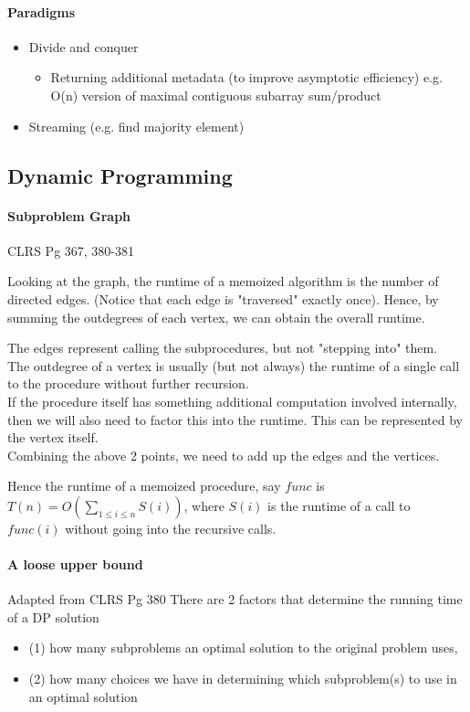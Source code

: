 \documentclass{article}
\begin{document}
\paragraph{Paradigms}
\begin{itemize}
	\item Divide and conquer
	\begin{itemize}
		\item Returning additional metadata (to improve asymptotic efficiency) e.g. O(n) version of maximal contiguous subarray sum/product
	\end{itemize}
	\item Streaming (e.g. find majority element)
\end{itemize}


\subsection{Dynamic Programming}
\paragraph{Subproblem Graph} CLRS Pg 367, 380-381

Looking at the graph, the runtime of a memoized algorithm is the number of directed edges. (Notice that each edge is "traversed" exactly once). Hence, by summing the outdegrees of each vertex, we can obtain the overall runtime.


The edges represent calling the subprocedures, but not "stepping into" them.\\
The outdegree of a vertex is usually (but not always) the runtime of a single call to the procedure without further recursion. \\
If the procedure itself has something additional computation involved internally, then we will also need to factor this into the runtime. This can be represented by the vertex itself.\\
Combining the above 2 points, we need to add up the edges and the vertices.

Hence the runtime of a memoized procedure, say $func$ is $T(n) = O(\sum_{1\leq i\leq n}S(i))$, where $S(i)$ is the runtime of a call to $func(i)$ without going into the recursive calls.

\paragraph{A loose upper bound} Adapted from CLRS Pg 380
There are 2 factors that determine the running time of a DP solution
\begin{itemize}
	\item (1) how many subproblems an optimal solution to the original problem uses,
	\item (2) how many choices we have in determining which subproblem(s) to use in an
optimal solution
\end{itemize}
\end{document}

